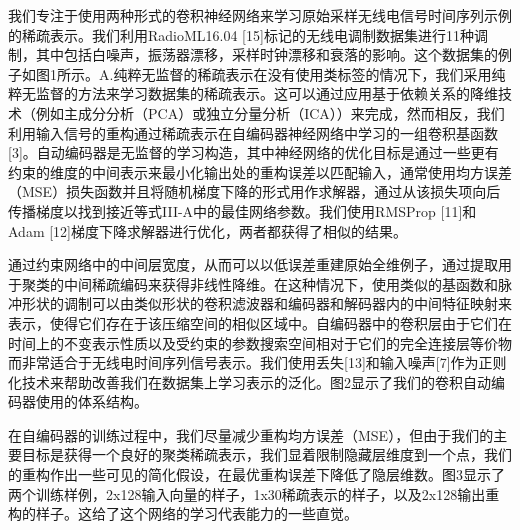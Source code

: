 我们专注于使用两种形式的卷积神经网络来学习原始采样无线电信号时间序列示例的稀疏表示。我们利用RadioML16.04 [15]标记的无线电调制数据集进行11种调制，其中包括白噪声，振荡器漂移，采样时钟漂移和衰落的影响。这个数据集的例子如图1所示。A.纯粹无监督的稀疏表示在没有使用类标签的情况下，我们采用纯粹无监督的方法来学习数据集的稀疏表示。这可以通过应用基于依赖关系的降维技术（例如主成分分析（PCA）或独立分量分析（ICA））来完成，然而相反，我们利用输入信号的重构通过稀疏表示在自编码器神经网络中学习的一组卷积基函数[3]。自动编码器是无监督的学习构造，其中神经网络的优化目标是通过一些更有约束的维度的中间表示来最小化输出处的重构误差以匹配输入，通常使用均方误差（MSE）损失函数并且将随机梯度下降的形式用作求解器，通过从该损失项向后传播梯度以找到接近等式III-A中的最佳网络参数。我们使用RMSProp [11]和Adam [12]梯度下降求解器进行优化，两者都获得了相似的结果。\par
通过约束网络中的中间层宽度，从而可以以低误差重建原始全维例子，通过提取用于聚类的中间稀疏编码来获得非线性降维。在这种情况下，使用类似的基函数和脉冲形状的调制可以由类似形状的卷积滤波器和编码器和解码器内的中间特征映射来表示，使得它们存在于该压缩空间的相似区域中。自编码器中的卷积层由于它们在时间上的不变表示性质以及受约束的参数搜索空间相对于它们的完全连接层等价物而非常适合于无线电时间序列信号表示。我们使用丢失[13]和输入噪声[7]作为正则化技术来帮助改善我们在数据集上学习表示的泛化。图2显示了我们的卷积自动编码器使用的体系结构。\par
在自编码器的训练过程中，我们尽量减少重构均方误差（MSE），但由于我们的主要目标是获得一个良好的聚类稀疏表示，我们显着限制隐藏层维度到一个点，我们的重构作出一些可见的简化假设，在最优重构误差下降低了隐层维数。图3显示了两个训练样例，2x128输入向量的样子，1x30稀疏表示的样子，以及2x128输出重构的样子。这给了这个网络的学习代表能力的一些直觉。\par